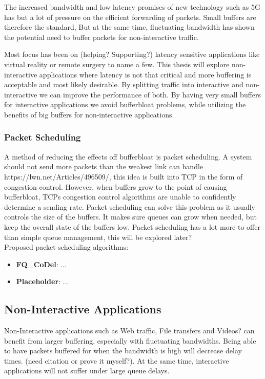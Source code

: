 \documentclass[a4paper,english, 11pt]{report}
\begin{document}
The increased bandwidth and low latency promises of new technology such as 5G has but a lot of pressure on the efficient forwarding of packets. Small buffers are therefore the standard, But at the same time, fluctuating bandwidth has shown the potential need to buffer packets for non-interactive traffic.

Most focus has been on (helping? Supporting?) latency sensitive applications like virtual reality or remote surgery to name a few. This thesis will explore non-interactive applications where latency is not that critical and more buffering is acceptable and most likely desirable. By splitting traffic into interactive and non-interactive we can improve the performance of both. By having very small buffers for interactive applications we avoid bufferbloat problems, while utilizing the benefits of big buffers for non-interactive applications.\\

\subsubsection{Packet Scheduling}
A method of reducing the effects off bufferbloat is packet scheduling. A system should not send more packets than the weakest link can handle {https://lwn.net/Articles/496509/}, this idea is built into TCP in the form of congestion control. However, when buffers grow to the point of causing bufferbloat, TCPs congestion control algorithms are unable to confidently determine a sending rate. Packet scheduling can solve this problem as it usually controls the size of the buffers. It makes sure queues can grow when needed, but keep the overall state of the buffers low. Packet scheduling has a lot more to offer than simple queue management, this will be explored later?\\

Proposed packet scheduling algorithms:
\begin{itemize}
  \item \textbf{FQ\_CoDel}: ...
  \item \textbf{Placeholder}: ...
\end{itemize}

\subsection{Non-Interactive Applications}
Non-Interactive applications such as Web traffic, File transfers and Videos? can benefit from larger buffering, especially with fluctuating bandwidths. Being able to have packets buffered for when the bandwidth is high will decrease delay times. (need citation or prove it myself?). At the same time, interactive applications will not suffer under large queue delays.
\end{document}
